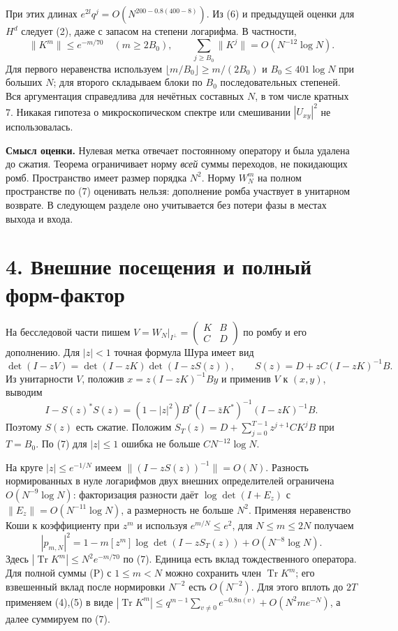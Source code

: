 \documentclass[11pt,a4paper]{article}
\newcommand{\Tr}{\operatorname{Tr}}
\newcommand{\sect}[1]{\section*{\sffamily\color{ink}#1}}
\newcommand{\subt}[1]{\par\medskip\noindent\textbf{#1.}\quad}
\begin{document}
При этих длинах $e^{2l}q^j=O(N^{200-0.8(400-8)})$. Из (6) и предыдущей оценки для $H^d$ следует (2), даже с запасом на степени логарифма. В частности,
\[
 \|K^m\|\le e^{-m/70}\quad (m\ge2B_0),\qquad
 \sum_{j\ge B_0}\|K^j\|=O(N^{-12}\log N).                              \tag{7}
\]
Для первого неравенства используем $\lfloor m/B_0\rfloor\ge m/(2B_0)$ и $B_0\le401\log N$ при больших $N$; для второго складываем блоки по $B_0$ последовательных степеней. Вся аргументация справедлива для нечётных составных $N$, в том числе кратных 7. Никакая гипотеза о микроскопическом спектре или смешивании $|U_{xy}|^2$ не использовалась.

\subt{Смысл оценки} Нулевая метка отвечает постоянному оператору и была удалена до сжатия. Теорема ограничивает норму \emph{всей} суммы переходов, не покидающих ромб. Пространство имеет размер порядка $N^2$. Норму $W_N^m$ на полном пространстве по (7) оценивать нельзя: дополнение ромба участвует в унитарном возврате. В следующем разделе оно учитывается без потери фазы в местах выхода и входа.
\newpage
\sect{4. Внешние посещения и полный форм-фактор}
На бесследовой части пишем $V=W_N|_{I^\perp}=\left(\begin{smallmatrix}K&B\\ C&D\end{smallmatrix}\right)$ по ромбу и его дополнению. Для $|z|<1$ точная формула Шура имеет вид
\[
 \det(I-zV)=\det(I-zK)\det(I-zS(z)),\qquad
 S(z)=D+zC(I-zK)^{-1}B.
\]
Из унитарности $V$, положив $x=z(I-zK)^{-1}By$ и применив $V$ к $(x,y)$, выводим
\[
 I-S(z)^*S(z)=(1-|z|^2)B^*(I-\bar zK^*)^{-1}(I-zK)^{-1}B .
\]
Поэтому $S(z)$ есть сжатие. Положим $S_T(z)=D+\sum_{j=0}^{T-1}z^{j+1}CK^jB$ при $T=B_0$. По (7) для $|z|\le1$ ошибка не больше $C N^{-12}\log N$.

На круге $|z|\le e^{-1/N}$ имеем $\|(I-zS(z))^{-1}\|=O(N)$. Разность нормированных в нуле логарифмов двух внешних определителей ограничена $O(N^{-9}\log N)$: факторизация разности даёт $\log\det(I+E_z)$ с $\|E_z\|=O(N^{-11}\log N)$, а размерность не больше $N^2$. Применяя неравенство Коши к коэффициенту при $z^m$ и используя $e^{m/N}\le e^2$, для $N\le m\le2N$ получаем
\[
 |p_{m,N}|^2
 =1-m[z^m]\log\det(I-zS_T(z))+O(N^{-8}\log N).                        \tag{8}
\]
Здесь $|\Tr K^m|\le N^2 e^{-m/70}$ по (7). Единица есть вклад тождественного оператора. Для полной суммы (P) с $1\le m<N$ можно сохранить член $\Tr K^m$; его взвешенный вклад после нормировки $N^{-2}$ есть $O(N^{-2})$. Для этого вплоть до $2T$ применяем (4),(5) в виде $|\Tr K^m|\le q^{m-1}\sum_{v\ne0}e^{-0.8n(v)}+O(N^2m e^{-N})$, а далее суммируем по (7).
\end{document}
